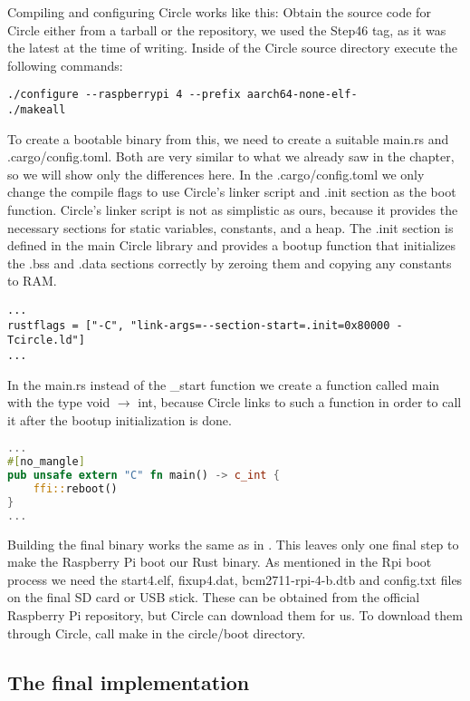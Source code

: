 Compiling and configuring Circle works like this:
Obtain the source code for Circle either from a tarball or the repository, we used the Step46 tag, as it was the latest at the time of writing.
Inside of the Circle source directory execute the following commands:
\begin{verbatim}
./configure --raspberrypi 4 --prefix aarch64-none-elf-
./makeall
\end{verbatim}

To create a bootable binary from this, we need to create a suitable main.rs and .cargo/config.toml.
Both are very similar to what we already saw in the  chapter, so we will show only the differences here.
In the .cargo/config.toml we only change the compile flags to use Circle's linker script and .init section as the boot function.
Circle's linker script is not as simplistic as ours, because it provides the necessary sections for static variables, constants, and a heap.
The .init section is defined in the main Circle library and provides a bootup function that initializes the .bss and .data sections correctly by zeroing them and copying any constants to RAM.
\begin{verbatim}
...
rustflags = ["-C", "link-args=--section-start=.init=0x80000 -Tcircle.ld"]
...
\end{verbatim}

In the main.rs instead of the \_start function we create a function called main with the type void $\rightarrow$ int,
because Circle links to such a function in order to call it after the bootup initialization is done.
\begin{lstlisting}[language=Rust,style=colouredRust]
...
#[no_mangle]
pub unsafe extern "C" fn main() -> c_int {
    ffi::reboot()
}
...
\end{lstlisting}

Building the final binary works the same as in .
This leaves only one final step to make the Raspberry Pi boot our Rust binary.
As mentioned in the Rpi boot process we need the start4.elf, fixup4.dat, bcm2711-rpi-4-b.dtb and config.txt files on the final SD card or USB stick.
These can be obtained from the official Raspberry Pi repository, but Circle can download them for us.
To download them through Circle, call make in the circle/boot directory.

\subsection{The final implementation}
\label{sec:concept_and_implementation:bare-metal:implementation}


